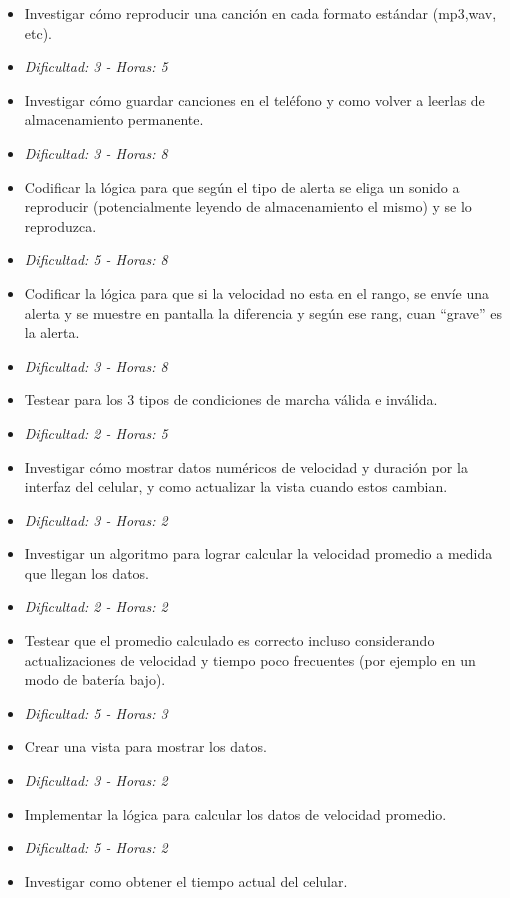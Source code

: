 \documentclass[10pt, a4paper,english,spanish]{article}
\begin{document}
\begin{itemize}
	\itemsep 0em
	\item Investigar cómo reproducir una canción en cada formato estándar (mp3,wav, etc).
	\item[] \hfill \textit{Dificultad: 3 - Horas: 5}
	\item Investigar cómo guardar canciones en el teléfono y como volver a leerlas de almacenamiento permanente.
	\item[] \hfill \textit{Dificultad: 3 - Horas: 8}
	\item Codificar la lógica para que según el tipo de alerta se eliga un sonido a reproducir (potencialmente leyendo de almacenamiento el mismo) y se lo reproduzca. 
	\item[] \hfill \textit{Dificultad: 5 - Horas: 8}
	\item Codificar la lógica para que si la velocidad no esta en el rango, se envíe una alerta y se muestre en pantalla la diferencia y según ese rang, cuan ``grave'' es la alerta. 
	\item[] \hfill \textit{Dificultad: 3 - Horas: 8}
	\item Testear para los 3 tipos de condiciones de marcha válida e inválida.
	\item[] \hfill \textit{Dificultad: 2 - Horas: 5}
	\item Investigar cómo mostrar datos numéricos de velocidad y duración por la interfaz del celular, y como actualizar la vista cuando estos cambian.
	\item[] \hfill \textit{Dificultad: 3 - Horas: 2}
	\item Investigar un algoritmo para lograr calcular la velocidad promedio a medida que llegan los datos.
	\item[] \hfill \textit{Dificultad: 2 - Horas: 2}
	\item Testear que el promedio calculado es correcto incluso considerando actualizaciones de velocidad y tiempo poco frecuentes 
		(por ejemplo en un modo de batería bajo).
	\item[] \hfill \textit{Dificultad: 5 - Horas: 3}
	\item Crear una vista para mostrar los datos.
	\item[] \hfill \textit{Dificultad: 3 - Horas: 2}
	\item Implementar la lógica para calcular los datos de velocidad promedio.
	\item[] \hfill \textit{Dificultad: 5 - Horas: 2}
	\item  Investigar como obtener el tiempo actual del celular.

\end{itemize}
\end{document}
